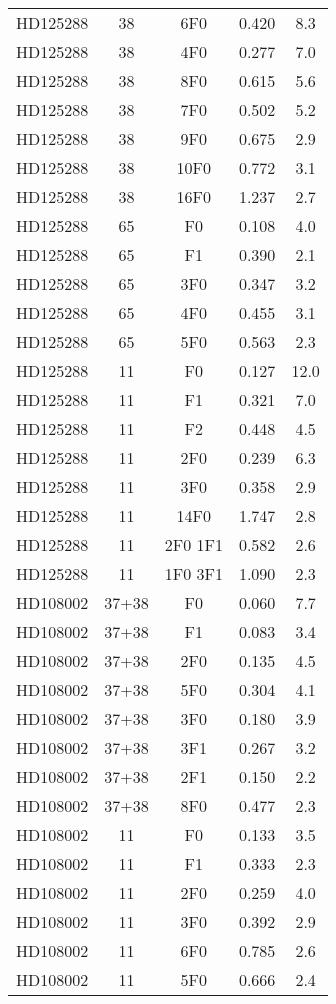 \begin{table*}
\begin{tabular}{l c c c c}
HD125288 & 38 & 6F0 & 0.420 & 8.3\\ 
HD125288 & 38 & 4F0 & 0.277 & 7.0\\ 
HD125288 & 38 & 8F0 & 0.615 & 5.6\\ 
HD125288 & 38 & 7F0 & 0.502 & 5.2\\ 
HD125288 & 38 & 9F0 & 0.675 & 2.9\\ 
HD125288 & 38 & 10F0 & 0.772 & 3.1\\ 
HD125288 & 38 & 16F0 & 1.237 & 2.7\\ 
\hline
HD125288 & 65 & F0 & 0.108 & 4.0\\ 
HD125288 & 65 & F1 & 0.390 & 2.1\\ 
HD125288 & 65 & 3F0 & 0.347 & 3.2\\ 
HD125288 & 65 & 4F0 & 0.455 & 3.1\\ 
HD125288 & 65 & 5F0 & 0.563 & 2.3\\ 
\hline
HD125288 & 11 & F0 & 0.127 & 12.0\\ 
HD125288 & 11 & F1 & 0.321 & 7.0\\ 
HD125288 & 11 & F2 & 0.448 & 4.5\\ 
HD125288 & 11 & 2F0 & 0.239 & 6.3\\ 
HD125288 & 11 & 3F0 & 0.358 & 2.9\\ 
HD125288 & 11 & 14F0 & 1.747 & 2.8\\ 
HD125288 & 11 & 2F0 1F1 & 0.582 & 2.6\\ 
HD125288 & 11 & 1F0 3F1 & 1.090 & 2.3\\ 
\hline
HD108002 & 37+38 & F0 & 0.060 & 7.7\\ 
HD108002 & 37+38 & F1 & 0.083 & 3.4\\ 
HD108002 & 37+38 & 2F0 & 0.135 & 4.5\\ 
HD108002 & 37+38 & 5F0 & 0.304 & 4.1\\ 
HD108002 & 37+38 & 3F0 & 0.180 & 3.9\\ 
HD108002 & 37+38 & 3F1 & 0.267 & 3.2\\ 
HD108002 & 37+38 & 2F1 & 0.150 & 2.2\\ 
HD108002 & 37+38 & 8F0 & 0.477 & 2.3\\ 
\hline
HD108002 & 11 & F0 & 0.133 & 3.5\\ 
HD108002 & 11 & F1 & 0.333 & 2.3\\ 
HD108002 & 11 & 2F0 & 0.259 & 4.0\\ 
HD108002 & 11 & 3F0 & 0.392 & 2.9\\ 
HD108002 & 11 & 6F0 & 0.785 & 2.6\\ 
HD108002 & 11 & 5F0 & 0.666 & 2.4\\ 

\end{tabular}
\end{table*}
